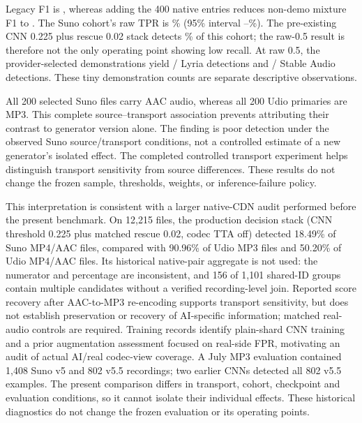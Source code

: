 \documentclass[10pt,a4paper]{article}
\begin{document}
\begin{table}[h]
\centering\small

\caption{ArtifactNet detail at raw threshold 0.5.
TPR intervals are empirical cluster
percentile intervals; the all-success Udio interval is degenerate and does not
establish zero population miss rate. Native F1 is undefined without real controls.}
\label{tab:checkpoint}
\end{table}

Legacy F1 is \CheckpointLegacyFone{}, whereas adding the 400 native entries
reduces non-demo mixture F1 to \CheckpointMixedFone{}. The Suno cohort's raw
TPR is \CheckpointSunoRawTpr{}\% (95\% interval
\CheckpointSunoRawLow{}--\CheckpointSunoRawHigh{}\%). The pre-existing CNN
0.225 plus rescue 0.02 stack detects \CheckpointSunoStackTpr{}\% of this cohort;
the raw-0.5 result is therefore not the only operating point showing low recall.
At raw 0.5, the provider-selected demonstrations yield
\CheckpointLyriaTP{}/\LyriaEntries{} Lyria detections and
\CheckpointStableTP{}/\StableAudioEntries{} Stable Audio detections. These tiny
demonstration counts are separate descriptive observations.

All 200 selected Suno files carry AAC audio, whereas all 200 Udio primaries are
MP3. This complete source--transport association prevents attributing their
contrast to generator version alone. The finding is poor detection under the
observed Suno source/transport conditions, not a controlled estimate of a new
generator's isolated effect. The completed controlled transport experiment helps
distinguish transport sensitivity from source differences. These results do
not change the frozen sample, thresholds, weights, or inference-failure policy.

This interpretation is consistent with a larger native-CDN audit performed
before the present benchmark. On 12,215 files, the production decision stack
(CNN threshold 0.225 plus matched rescue 0.02, codec TTA off) detected
18.49\% of Suno MP4/AAC files, compared with 90.96\% of Udio MP3 files and
50.20\% of Udio MP4/AAC files. Its historical native-pair aggregate is not used:
the numerator and percentage are inconsistent, and 156 of 1,101 shared-ID
groups contain multiple candidates without a verified recording-level join.
Reported score recovery after AAC-to-MP3 re-encoding supports transport
sensitivity, but does not establish preservation or recovery of AI-specific
information; matched real-audio controls are required. Training records identify
plain-shard CNN training and a prior augmentation assessment focused on real-side
FPR, motivating an audit of actual AI/real codec-view coverage. A July MP3
evaluation contained 1,408 Suno v5 and 802 v5.5 recordings; two earlier CNNs
detected all 802 v5.5 examples. The present comparison differs in transport,
cohort, checkpoint and evaluation conditions, so it cannot isolate their
individual effects. These historical diagnostics do not change the frozen
evaluation or its operating points.
\end{document}
